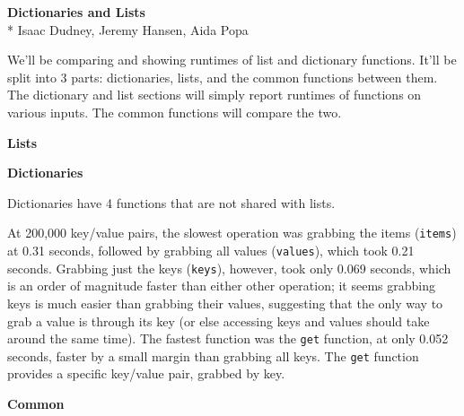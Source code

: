 \documentclass[11pt]{article}
\begin{document}
\noindent
\textbf{Dictionaries and Lists}\\*
Isaac Dudney, Jeremy Hansen, Aida Popa

We'll be comparing and showing runtimes of list and dictionary functions.
It'll be split into 3 parts: dictionaries, lists, and the common functions between them.
The dictionary and list sections will simply report runtimes of functions on various inputs.
The common functions will compare the two.

\noindent
\textbf{Lists}


\noindent
\textbf{Dictionaries}

Dictionaries have 4 functions that are not shared with lists.

At 200,000 key/value pairs, the slowest operation was grabbing the items (\texttt{items}) at 0.31 seconds, followed by grabbing all values (\texttt{values}), which took 0.21 seconds.
Grabbing just the keys (\texttt{keys}), however, took only 0.069 seconds, which is an order of magnitude faster than either other operation; it seems grabbing keys is much easier than grabbing their values, suggesting that the only way to grab a value is through its key (or else accessing keys and values should take around the same time).
The fastest function was the \texttt{get} function, at only 0.052 seconds, faster by a small margin than grabbing all keys.
The \texttt{get} function provides a specific key/value pair, grabbed by key.

\noindent
\textbf{Common}
\end{document}
